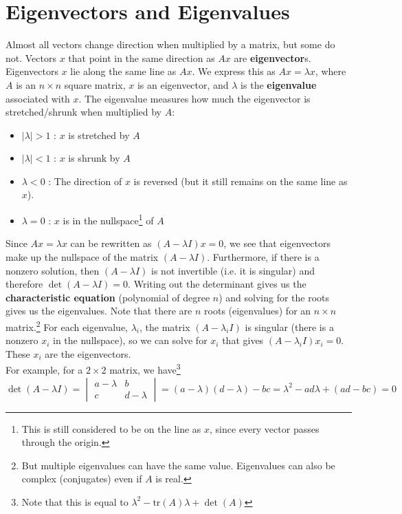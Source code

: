 \documentclass[11pt]{article}
\theoremstyle{plain}
\theoremstyle{definition}
\theoremstyle{remark}
\numberwithin{equation}{section}
\begin{document}
\section{Eigenvectors and Eigenvalues}

Almost all vectors change direction when multiplied by a matrix, but some do not. Vectors $x$ that point in the same direction as $A x$ are {\bf eigenvector}s. Eigenvectors $x$ lie along the same line as $Ax$. We express this as $A x = \lambda x$, where $A$ is an $n \times n$ square matrix, $x$ is an eigenvector, and $\lambda$ is the {\bf eigenvalue} associated with $x$. The eigenvalue measures how much the eigenvector is stretched/shrunk when multiplied by $A$:
\begin{itemize}[noitemsep] %
\item $|\lambda| > 1$ : $x$ is stretched by $A$
\item $|\lambda| < 1$ : $x$ is shrunk by $A$
\item $\lambda < 0$ : The direction of $x$ is reversed (but it still remains on the same line as $x$).
\item $\lambda = 0$ : $x$ is in the nullspace\footnote{This is still considered to be on the line as $x$, since every vector passes through the origin.} of $A$
\end{itemize}

Since $A x = \lambda x$ can be rewritten as $(A - \lambda I) x = 0$, we see that eigenvectors make up the nullspace of the matrix $(A - \lambda I)$. Furthermore, if there is a nonzero solution, then $(A - \lambda I)$ is not invertible (i.e. it is singular) and therefore $\det (A - \lambda I) = 0$. Writing out the determinant gives us the {\bf characteristic equation} (polynomial of degree $n$) and solving for the roots gives us the eigenvalues. Note that there are $n$ roots (eigenvalues) for an $n \times n$ matrix.\footnote{But multiple eigenvalues can have the same value. Eigenvalues can also be complex (conjugates) even if $A$ is real.} For each eigenvalue, $\lambda_i$, the matrix $(A - \lambda_i I)$ is singular (there is a nonzero $x_i$ in the nullspace), so we can solve for $x_i$ that gives $(A - \lambda_i I) x_i = 0$. These $x_i$ are the eigenvectors.
\\

For example, for a $2 \times 2$ matrix, we have\footnote{Note that this is equal to $\lambda^2 - \text{tr}(A) \lambda + \det(A)$}
\begin{equation*}
\det (A -\lambda I) = \begin{vmatrix} a - \lambda & b \\ c & d - \lambda \end{vmatrix} = (a - \lambda) (d - \lambda) - b c = \lambda^2 - a d \lambda + (a d - b c) = 0
\end{equation*}
\end{document}
